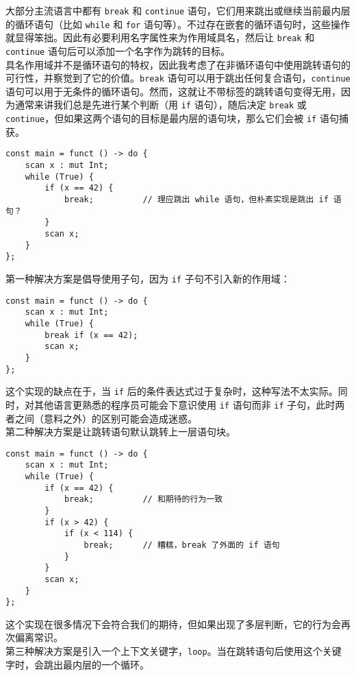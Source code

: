大部分主流语言中都有 \lstinline!break! 和 \lstinline!continue! 语句，它们用来跳出或继续当前最内层的循环语句（比如 \lstinline!while! 和 \lstinline!for! 语句等）。不过存在嵌套的循环语句时，这些操作就显得笨拙。因此有必要利用名字属性来为作用域具名，然后让 \lstinline!break! 和 \lstinline!continue! 语句后可以添加一个名字作为跳转的目标。 \\

具名作用域并不是循环语句的特权，因此我考虑了在非循环语句中使用跳转语句的可行性，并察觉到了它的价值。\lstinline!break! 语句可以用于跳出任何复合语句，\lstinline!continue! 语句可以用于无条件的循环语句。然而，这就让不带标签的跳转语句变得无用，因为通常来讲我们总是先进行某个判断（用 \lstinline!if! 语句），随后决定 \lstinline!break! 或 \lstinline!continue!，但如果这两个语句的目标是最内层的语句块，那么它们会被 \lstinline!if! 语句捕获。

\begin{lstlisting}
const main = funct () -> do {
	scan x : mut Int;
	while (True) {
		if (x == 42) {
			break;			// 理应跳出 while 语句，但朴素实现是跳出 if 语句？
		}
		scan x;
	}
};
\end{lstlisting}

第一种解决方案是倡导使用子句，因为 \lstinline!if! 子句不引入新的作用域：

\begin{lstlisting}
const main = funct () -> do {
	scan x : mut Int;
	while (True) {
		break if (x == 42);
		scan x;
	}
};
\end{lstlisting}

这个实现的缺点在于，当 \lstinline!if! 后的条件表达式过于复杂时，这种写法不太实际。同时，对其他语言更熟悉的程序员可能会下意识使用 \lstinline!if! 语句而非 \lstinline!if! 子句，此时两者之间（意料之外）的区别可能会造成迷惑。 \\

第二种解决方案是让跳转语句默认跳转上一层语句块。

\begin{lstlisting}
const main = funct () -> do {
	scan x : mut Int;
	while (True) {
		if (x == 42) {
			break;			// 和期待的行为一致
		}
		if (x > 42) {
			if (x < 114) {
				break;		// 糟糕，break 了外面的 if 语句
			}
		}
		scan x;
	}
};
\end{lstlisting}

这个实现在很多情况下会符合我们的期待，但如果出现了多层判断，它的行为会再次偏离常识。 \\

第三种解决方案是引入一个上下文关键字，\lstinline!loop!。当在跳转语句后使用这个关键字时，会跳出最内层的一个循环。

